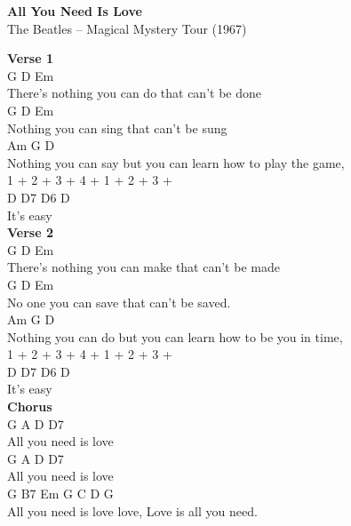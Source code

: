 \documentclass[a4paper]{article}
\begin{document}
    \begin{center}
        \textbf{All You Need Is Love}
        ~\\
        The Beatles -- Magical Mystery Tour (1967)
    \end{center}
    {
        \scriptsize
        \textbf{Verse 1}
        ~\\
        {
            \cutive
            \obeyspaces
G                        D                Em
\\
 There's nothing you can do that can't be done
\\
G                D                  Em
\\
 Nothing you can sing that can't be sung
\\
Am               G                     D
\\
 Nothing you can say but you can learn how to play the game,
\\
      1 + 2 + 3 + 4 + 1 + 2 + 3 +
\\
      D       D7      D6      D
\\
 It's easy
\\

        }
        \textbf{Verse 2}
        ~\\
        {
            \cutive
            \obeyspaces
G                        D                  Em
\\
 There's nothing you can make that can't be made
\\
G             D               Em
\\
 No one you can save that can't be saved.
\\
Am               G               D
\\
 Nothing you can do but you can learn how to be you in time,
\\
      1 + 2 + 3 + 4 + 1 + 2 + 3 +
\\
      D       D7      D6      D
\\
 It's easy
\\

        }
        \textbf{Chorus}
        ~\\
        {
            \cutive
            \obeyspaces
G        A        D     D7
\\
All you need is love
\\
G        A        D     D7
\\
All you need is love
\\
G        B7      Em   G    C       D       G
\\
All you need is love love, Love is all you need.
\\

}}
\end{document}
